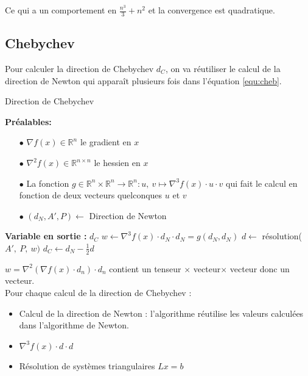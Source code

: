 Ce qui a un comportement en $\frac{n^3}{3}+n^2$ et la convergence est quadratique.


\subsection{Chebychev}

Pour calculer la direction de Chebychev $d_C$, on va r\'eutiliser le calcul 
de la direction de Newton qui apparaît plusieurs fois dans l'\'equation \eqref{equ:cheb}. %

\begin{algorithm}                     %
\caption{Direction de Chebychev}          %
\label{alg:3}                           %
\begin{algorithmic}  
\STATE \textbf{Pr\'ealables:} %
\begin{itemize}
\item[$\bullet$] $\nabla f(x)\in \mathbb{R}^n$ le gradient en $x$
\item[$\bullet$] $\nabla^2 f(x)\in \mathbb{R}^{n\times n}$ le hessien en $x$
\item[$\bullet$] La fonction $g\in \mathbb{R}^n\times\mathbb{R}^n \rightarrow \mathbb{R}^{n} : u,\ v \mapsto \nabla^3 f(x)\cdot u\cdot v$ qui fait le calcul en fonction
de deux vecteurs quelconques $u$ et $v$
\item[$\bullet$] $(d_N,A',P)\leftarrow$ Direction de Newton
\end{itemize}

\STATE \textbf{Variable en sortie :} $d_C$
\STATE $w \leftarrow \nabla^3 f(x) \cdot d_N \cdot d_N = g(d_N,d_N)$
\STATE $d \leftarrow$ r\'esolution($A',\ P,\ w)$ 
\STATE $d_C \leftarrow d_N-\frac{1}{2}d$
\end{algorithmic}
\end{algorithm}


 $w=\nabla^2 (\nabla f(x)\cdot d_n)\cdot d_n$ contient un tenseur $\times$ vecteur$\times$ vecteur donc un vecteur.\\

Pour chaque calcul de la direction de Chebychev :
\begin{itemize}
\item Calcul de la direction de Newton : l'algorithme r\'eutilise les valeurs calcul\'ees dans l'algorithme de Newton.
\item $\nabla^3 f(x)\cdot d\cdot d$
\item R\'esolution de syst\`emes triangulaires $Lx=b$ 
\end{itemize}

